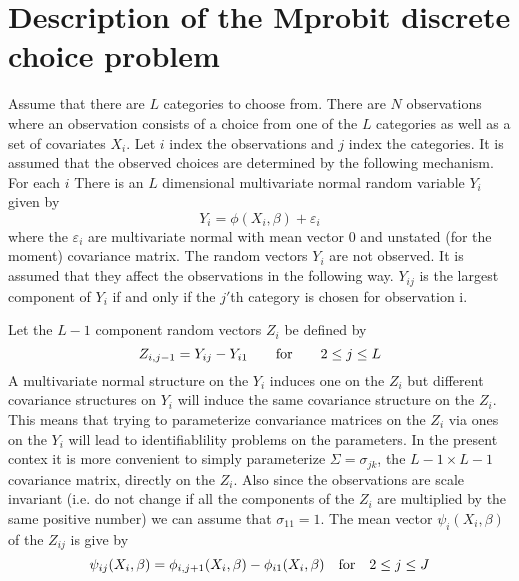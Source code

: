 %
%

%
%
\section{Description of the Mprobit discrete choice problem}
Assume that there are $L$ categories to choose from. There are $N$
observations where an observation consists of a choice from one of the
$L$ categories as well as a set of covariates $X_i$. 
Let $i$ index the observations and 
$j$ index the categories. It is assumed that
the observed choices are determined by the following mechanism.
For each $i$  There is an $L$ dimensional
 multivariate normal random variable 
$Y_i$ given by
$$Y_i=\phi(X_i,\beta) +\varepsilon_i$$ 
where the $\varepsilon_i$ are multivariate normal with mean vector $0$
and unstated (for the moment) covariance matrix.
The random vectors $Y_i$ are not observed. It is assumed that
they affect the observations in the following way.
$Y_{ij}$ is the largest component of $Y_i$ if and only if
the $j'$th category is chosen for observation i.

Let the $L-1$ component random vectors $Z_i$ be defined by
$$Z_{i,j-1}=Y_{ij}-Y_{i1} \qquad\hbox{\rm for}\qquad 2\le j\le L$$
A multivariate normal structure on the $Y_i$ induces one on the
$Z_i$ but different covariance structures on $Y_i$ will induce the
same covariance structure on the $Z_i$.  This means that
trying to parameterize convariance matrices on the $Z_i$
via ones on the $Y_i$ will lead to identifiablility problems
on the parameters. In the present contex it is more convenient
to simply parameterize $\Sigma=\sigma_{jk}$,
the $L-1 \times L-1$ covariance matrix,
 directly
on the $Z_i$. Also since the observations are scale invariant
(i.e. do not change if all the components of the $Z_i$ are multiplied
by the same positive number) we can assume that  $\sigma_{11}=1$.
The mean vector $\psi_i(X_i,\beta)$ of the $Z_{ij}$ is give by
$$\psi_{ij}(X_i,\beta)=\phi_{i,j+1}(X_i,\beta)-\phi_{i1}(X_i,\beta)
 \quad \hbox{\rm for} \quad 2\le j\le J$$

